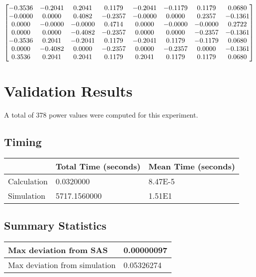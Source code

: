\documentclass{glimmpse-report}
\begin{document}
\begin{eqnarray*}
\begin{bmatrix}
-0.3536 & -0.2041 & 0.2041 & 0.1179 & -0.2041 & -0.1179 & 0.1179 & 0.0680\protect\\
-0.0000 & 0.0000 & 0.4082 & -0.2357 & -0.0000 & 0.0000 & 0.2357 & -0.1361\protect\\
0.0000 & -0.0000 & -0.0000 & 0.4714 & 0.0000 & -0.0000 & -0.0000 & 0.2722\protect\\
0.0000 & 0.0000 & -0.4082 & -0.2357 & 0.0000 & 0.0000 & -0.2357 & -0.1361\protect\\
-0.3536 & 0.2041 & -0.2041 & 0.1179 & -0.2041 & 0.1179 & -0.1179 & 0.0680\protect\\
0.0000 & -0.4082 & 0.0000 & -0.2357 & 0.0000 & -0.2357 & 0.0000 & -0.1361\protect\\
0.3536 & 0.2041 & 0.2041 & 0.1179 & 0.2041 & 0.1179 & 0.1179 & 0.0680\protect\\
\end{bmatrix}
\end{eqnarray*}


\section{Validation Results}
A total of 378 power values were computed for this experiment.

\subsection{Timing}
\begin{tabular}{|l|l|l|}
\hline
 & Total Time (seconds) & Mean Time (seconds) \\ 
\hline
Calculation & 0.0320000 & 8.47E-5\tabularnewline
\hline
Simulation & 5717.1560000 & 1.51E1\tabularnewline
\hline
\end{tabular}
\subsection{Summary Statistics}
\begin{tabular}{|l|l|}
\hline
Max deviation from SAS & 0.00000097\tabularnewline
\hline

Max deviation from simulation & 0.05326274\tabularnewline
\hline

\end{tabular}
\end{document}
